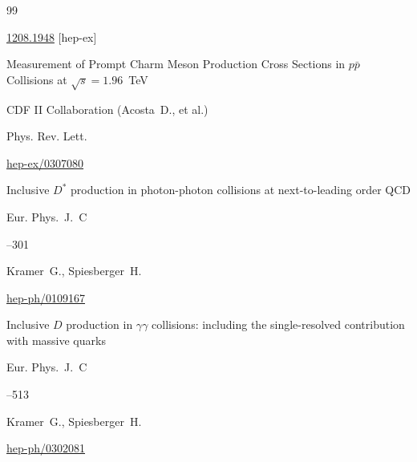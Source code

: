 \begin{thebibliography}{99}

\arxiv \href{http://arxiv.org/abs/1208.1948}{1208.1948} [hep-ex]




\paper Measurement of Prompt Charm Meson Production Cross Sections in $p\bar p$ Collisions at $\sqrt s=1.96$~TeV

\by CDF II Collaboration   (Acosta~D., et al.)

\jour Phys. Rev. Lett. 






\arxiv \href{http://arxiv.org/abs/hep-ex/0307080}{hep-ex/0307080}




\paper Inclusive $D^*$ production in photon-photon collisions at next-to-leading order QCD


\jour Eur. Phys.~J.~C 



--301

\by Kramer~G., Spiesberger~H.


\arxiv \href{http://arxiv.org/abs/hep-ph/0109167}{hep-ph/0109167}






\paper Inclusive $D$ production in $\gamma \gamma$ collisions: including the single-resolved contribution with massive quarks


\jour Eur. Phys.~J.~C 



--513

\by Kramer~G., Spiesberger~H.


\arxiv \href{http://arxiv.org/abs/hep-ph/0302081}{hep-ph/0302081}




\end{thebibliography}
